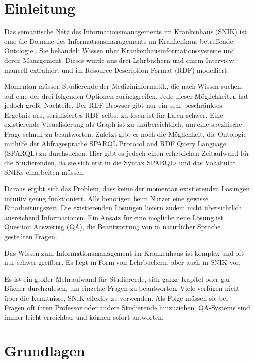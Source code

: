 \documentclass[utf8,biblatex]{lni}
\begin{document}
\section{Einleitung}
Das semantische Netz des Informationsmanagements im Krankenhaus (SNIK) ist eine
die Domäne des Informationsmanagements im Krankenhaus betreffende Ontologie \cite{domaene}.
Sie behandelt Wissen über Krankenhausinformationssysteme und deren Management.
Dieses wurde aus drei Lehrbüchern \cite{bb,ob,he} und einem Interview \cite{ciosurvey} manuell extrahiert und im Resource Description Format (RDF) modelliert.

Momentan müssen Studierende der Medizininformatik, die nach Wissen suchen, auf eine der drei folgenden Optionen zurückgreifen.
Jede dieser Möglichkeiten hat jedoch große Nachteile.
Der RDF-Browser gibt nur ein sehr beschränktes Ergebnis aus, serialisiertes RDF selbst zu lesen ist für Laien schwer.
Eine existierende Visualisierung als Graph ist zu unübersichtlich, um eine spezifische Frage schnell zu beantworten.
Zuletzt gibt es noch die Möglichkeit, die Ontologie mithilfe der Abfragesprache SPARQL Protocol and RDF Query Language (SPARQL) zu durchsuchen.
Hier gibt es jedoch einen erheblichen Zeitaufwand für die Studierenden, da sie sich erst in die Syntax SPARQLs und das Vokabular SNIKs einarbeiten müssen.

Daraus ergibt sich das Problem, dass keine der momentan existierenden Lösungen intuitiv genug funktioniert.
Alle benötigen beim Nutzer eine gewisse Einarbeitungszeit.
Die existierenden Lösungen liefern zudem nicht übersichtlich ausreichend Informationen.
Ein Ansatz für eine mögliche neue Lösung ist Question Answering (QA), die Beantwortung von in natürlicher Sprache gestellten Fragen.

Das Wissen zum Informationsmanagement im Krankenhaus ist komplex und oft nur schwer greifbar.
Es liegt in Form von Lehrbüchern, aber auch in SNIK vor.

Es ist ein großer Mehraufwand für Studierende, sich ganze Kapitel oder gar Bücher durchzulesen, um einzelne Fragen zu beantworten.
Viele verfügen nicht über die Kenntnisse, SNIK effektiv zu verwenden.
Als Folge müssen sie bei Fragen oft ihren Professor oder andere Studierende hinzuziehen.
QA-Systeme sind immer leicht erreichbar und können sofort antworten.

\section{Grundlagen}
\end{document}
